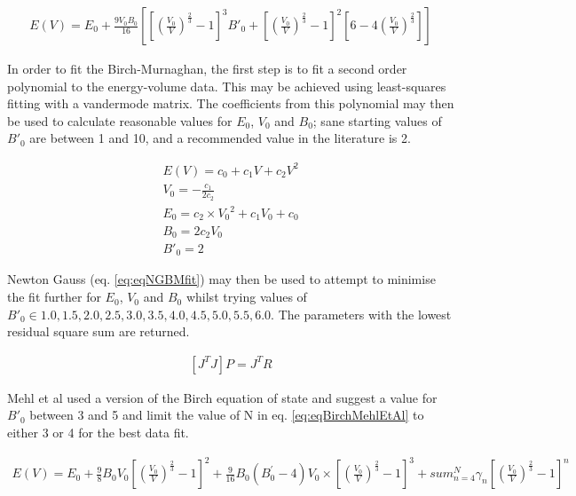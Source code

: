 \begin{equation}
\begin{split}
E(V) = E_0 + \frac{9 V_0 B_0}{16} \left[ \left[ \left(\frac{V_0}{V} \right)^{\frac{2}{3}}-1\right]^{3} {B'}_0 + \left[ \left(\frac{V_0}{V} \right)^{\frac{2}{3}}-1\right]^{2} \left[6 - 4 \left(\frac{V_0}{V} \right)^{\frac{2}{3}}\right] \right]
\end{split}
\label{eq:eqMurnachanEquationofStateVolume}
\end{equation}

In order to fit the Birch-Murnaghan, the first step is to fit a second order polynomial to the energy-volume data.  This may be achieved using least-squares fitting with a vandermode matrix.  The coefficients from this polynomial may then be used to calculate reasonable values for $E_0$, $V_0$ and $B_0$; sane starting values of ${B'}_0$ are between 1 and 10, and a recommended value in the literature is 2\cite{gilgamesheos}.

\begin{equation}
\begin{split}
E(V) = c_0 + c_1 V + c_2 V^2 \\
V_0 = -\frac{c_1}{2c_2} \\
E_0 = c_2 \times {V_0}^2 + c_1 V_0 + c_0  \\
B_0 = 2 c_2 V_0 \\
{B'}_0 = 2
\end{split}
\label{eq:eqMurnachanEquationofStateVolume}
\end{equation}

Newton Gauss (eq. \ref{eq:eqNGBMfit}) may then be used to attempt to minimise the fit further for $E_0$, $V_0$ and $B_0$ whilst trying values of ${B'}_0 \in {1.0,1.5,2.0,2.5,3.0,3.5,4.0,4.5,5.0,5.5,6.0}$.  The parameters with the lowest residual square sum are returned.

\begin{equation}
\begin{split}
\left[J^T J\right] P = J^T R
\end{split}
\label{eq:eqNGBMfit}
\end{equation}

Mehl et al used a version of the Birch equation of state\cite{birchmurnaghaneq} and suggest a value for ${B'}_0$ between 3 and 5\cite{mehlsp} and limit the value of N in eq. \ref{eq:eqBirchMehlEtAl} to either 3 or 4 for the best data fit.

\begin{equation}
\begin{split}
E(V) = E_0 + \frac{9}{8} B_0 V_0 \left[ \left(\frac{V_0}{V}\right)^{\frac{2}{3}} - 1 \right]^{2} + \frac{9}{16} B_0(B_0^{'} - 4) V_0 \times \left[ \left(\frac{V_0}{V}\right)^{\frac{2}{3}} - 1 \right]^{3} + sum_{n=4}^{N} \gamma_n \left[ \left(\frac{V_0}{V}\right)^{\frac{2}{3}} - 1 \right]^{n}
\end{split}
\label{eq:eqBirchMehlEtAl}
\end{equation}

